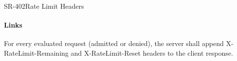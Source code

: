 \begin{softwarerequirement}{SR-402}{Rate Limit Headers}
\paragraph{Links} 

For every evaluated request (admitted or denied),
the server shall append X-RateLimit-Remaining and X-RateLimit-Reset headers
to the client response.
\end{softwarerequirement}